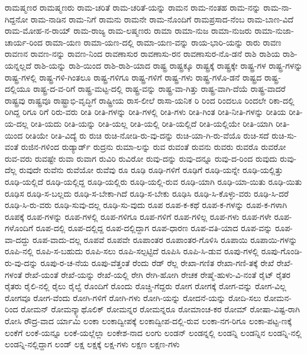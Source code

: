 {ರಾಮಷ್ಮಣರ
ರಾಮಷ್ಮಣರು
ರಾಮ-ಚರಿತೆ
ರಾಮ-ಚರಿತೆ-ಯನ್ನು
ರಾಮನ
ರಾಮ-ನಂತಹ
ರಾಮ-ನನ್ನು
ರಾಮ-ನಾ-ಗಿದ್ದನೋ
ರಾಮ-ನಾಡಿನ
ರಾಮ-ನಿಗೆ
ರಾಮನು
ರಾಮನೇ
ರಾಮ-ನೊಂದಿಗೆ
ರಾಮಪ್ರಸಾದ-ನೆಂಬ
ರಾಮ-ಬಾಣ-ವಿದೆ
ರಾಮ-ಮೋಹ-ನ-ರಾಯ್
ರಾಮ-ರಾಜ್ಯ
ರಾಮ-ಲಷ್ಮಣರು
ರಾಮಾ
ರಾಮಾ-ನುಜ
ರಾಮಾ-ನುಜರು
ರಾಮಾ-ನುಜಾ-ಚಾರ್ಯ-ರಿಂದ
ರಾಮಾ-ಯಣ
ರಾಮಾ-ಯಣ-ದಲ್ಲಿ
ರಾಮಾ-ಯಣ-ವನ್ನು
ರಾಯ-ಭಾರಿ-ಯನ್ನು
ರಾರು
ರಾವಣ
ರಾವಣನ
ರಾವಣ-ನನ್ನು
ರಾವಣ-ನಿಂದ
ರಾವಣಾಸುರ
ರಾವಣಾಸು-ರನ
ರಾವಣಾಸುರ-ನೊ-ಡನೆ
ರಾಶಿ
ರಾಶಿಯ
ರಾಶಿ-ಯನ್ನಲ್ಲದೆ
ರಾಶಿ-ಯನ್ನು
ರಾಶಿ-ಯಿಂದ
ರಾಶಿ-ರಾಶಿ-ಯಾದ
ರಾಷ್ಟ್ರ
ರಾಷ್ಟ್ರಕ್ಕೂ
ರಾಷ್ಟ್ರಕ್ಕೆ
ರಾಷ್ಟ್ರಕ್ಕೇ
ರಾಷ್ಟ್ರ-ಗಳ
ರಾಷ್ಟ್ರ-ಗಳನ್ನು
ರಾಷ್ಟ್ರ-ಗಳಲ್ಲಿ
ರಾಷ್ಟ್ರ-ಗಳಿ-ಗಿಂತಲೂ
ರಾಷ್ಟ್ರ-ಗಳಿಗೂ
ರಾಷ್ಟ್ರ-ಗಳಿಗೆ
ರಾಷ್ಟ್ರ-ಗಳು
ರಾಷ್ಟ್ರ-ಗಳೊ-ಡನೆ
ರಾಷ್ಟ್ರದ
ರಾಷ್ಟ್ರ-ದಲ್ಲಿಯೂ
ರಾಷ್ಟ್ರ-ದ-ವ-ರಿಗೆ
ರಾಷ್ಟ್ರ-ಮಟ್ಟ-ದಲ್ಲಿ
ರಾಷ್ಟ್ರ-ವನ್ನು
ರಾಷ್ಟ್ರ-ವಾ-ಗಿತ್ತು
ರಾಷ್ಟ್ರ-ವಾಗಿ-ದೆಯೆ
ರಾಷ್ಟ್ರ-ವಾದರೆ
ರಾಷ್ಟ್ರವು
ರಾಷ್ಟ್ರವೂ
ರಾಷ್ಟ್ರಾಭಿ-ವೃದ್ಧಿಗೆ
ರಾಷ್ಟ್ರೀಯ
ರಾಸ-ಲೀಲೆ
ರಾಸಾ-ಯನಿಕ
ರಿ
ರಿಂದ
ರಿಂದಲೂ
ರಿಂದಲೇ
ರಿಕಾ-ದಲ್ಲಿ
ರಿಗಿದ್ದ
ರಿಗೂ
ರಿಗೆ
ರಿರು-ವರು
ರೀತಿ
ರೀತಿ-ಗಳನ್ನು
ರೀತಿ-ಗಳಲ್ಲಿ
ರೀತಿ-ಗಳು
ರೀತಿ-ಗಿಂತ
ರೀತಿ-ನೀತಿ-ಗಳನ್ನು
ರೀತಿಯ
ರೀತಿ-ಯ-ದಲ್ಲ
ರೀತಿ-ಯದು
ರೀತಿ-ಯನ್ನು
ರೀತಿ-ಯಲ್ಲ
ರೀತಿ-ಯಲ್ಲಿ
ರೀತಿ-ಯಲ್ಲಿದೆ
ರೀತಿ-ಯಲ್ಲಿಯೇ
ರೀತಿ-ಯಾಗಿ
ರೀತಿ-ಯಿಂದ
ರೀತಿಯೇ
ರೀತಿ-ವಿದ್ಯೆ
ರು
ರುಚಿ
ರುಚಿ-ನೋಡಿ-ರು-ವು-ದನ್ನು
ರುಚಿ-ಯಾ-ಗಿ-ರು-ವೆಯೊ
ರುಚಿ-ಸದೆ
ರುಚಿ-ಸು-ವಂತೆ
ರುಜಿನ-ಗಳಿಂದ
ರುಡ್ಯಾರ್ಡ್
ರುದ್ರನು
ರುಮಾ-ಲನ್ನು
ರುವ
ರುವಂತೆ
ರುವನು
ರುವರು
ರುವರೊ
ರುವರೋ
ರುವ-ವರು
ರುವಷ್ಟೇ
ರುವಾ
ರುವಾಗ
ರುವಿರಿ
ರುವಿರೋ
ರುವು-ದನ್ನು
ರುವು-ದನ್ನೂ
ರುವು-ದ-ರಿಂದ
ರುವುದು
ರುವು-ದೆಲ್ಲ
ರುವುದೇ
ರುವೆನು
ರುವೆಯೋ
ರುವೆವು
ರೂ
ರೂಢಿ
ರೂಢಿ-ಗಳಿಗೆ
ರೂಢಿಗೆ
ರೂಢಿ-ಯನ್ನೇ
ರೂಢಿ-ಯಲ್ಲಿತ್ತು
ರೂಢಿ-ಯಲ್ಲಿದೆ
ರೂಢಿ-ಯಲ್ಲಿದ್ದ
ರೂಢಿ-ಯಲ್ಲಿರು
ರೂಢಿ-ಯಲ್ಲಿ-ರುವ
ರೂಢಿ-ಯಾಗಿ
ರೂಢಿ-ಯಾ-ಯಿತು
ರೂಢಿ-ಯಿತು
ರೂಢಿಸ
ರೂಢಿ-ಸ-ಬಲ್ಲದು
ರೂಢಿ-ಸ-ಬೇಕಾ-ಗಿದೆ
ರೂಢಿ-ಸ-ಬೇಕು
ರೂಢಿಸಿ
ರೂಢಿ-ಸಿ-ಕೊಳ್ಳು-ವರು
ರೂಢಿ-ಸಿ-ದರೆ
ರೂಢಿ-ಸಿ-ರು-ವರು
ರೂಢಿ-ಸುವು-ದಲ್ಲ
ರೂಢಿ-ಸು-ವುದು
ರೂಪ
ರೂಪ-ಕ-ಕಥೆ
ರೂಪ-ಕ-ಗಳನ್ನು
ರೂಪ-ಕ-ಗಳಾಗಿ
ರೂಪಕ್ಕೆ
ರೂಪ-ಗಳನ್ನು
ರೂಪ-ಗಳಲ್ಲಿ
ರೂಪ-ಗಳಿಗೂ
ರೂಪ-ಗಳಿಗೆ
ರೂಪ-ಗಳಿಲ್ಲ
ರೂಪ-ಗಳು
ರೂಪ-ಗಳೇ
ರೂಪ-ಗಳೊಂದಿಗೆ
ರೂಪ-ದಲ್ಲಿ
ರೂಪ-ದಲ್ಲಿದ್ದ
ರೂಪ-ದಲ್ಲಿದ್ದಾಗ
ರೂಪ-ಧಾರಣ
ರೂಪ-ವತಿ-ಯಾದ
ರೂಪ-ವನ್ನು
ರೂಪ-ವಾ-ದದ್ದು
ರೂಪ-ವಾದು-ದಲ್ಲ
ರೂಪವೆ
ರೂಪವೇ
ರೂಪಾಂತರ
ರೂಪಾಂತರ-ಗೊಳಿಸಿ
ರೂಪಾಯಿ
ರೂಪಾಯಿ-ಗಳನ್ನು
ರೂಪಿ-ನಲ್ಲಿ
ರೂಪಿ-ಸ-ಬಹುದು
ರೂಪಿ-ಸಲು
ರೂಪಿ-ಸಲ್ಪಟ್ಟಿದೆ
ರೂಪಿಸಿ
ರೂಪಿ-ಸಿ-ಡುವ
ರೂಪು-ಗಳಲ್ಲಿ
ರೂಪು-ಗೊಂಡಿ-ರು-ವು-ದನ್ನು
ರೂಪು-ರ-ಚ-ನೆಯ
ರೂಪು-ವೆತ್ತಂತೆ
ರೆಂದು
ರೆಡ್
ರೆಲ್ಲ
ರೇಖಾ-ಗಣಿತ
ರೇಖಾ-ಗಣಿ-ತಕ್ಕೆ
ರೇಖೆ
ರೇಖೆ-ಗಳಂತೆ
ರೇಖೆ-ಯಂತೆ
ರೇಖೆ-ಯನ್ನು
ರೇಖೆ-ಯಲ್ಲಿ
ರೇಗಿ
ರೇಗಿ-ಹೋಗಿ
ರೇಚಕ
ರೇಷ್ಮೆ-ಹುಳು-ವಿ-ನಂತೆ
ರೈಟ್
ರೈತರ
ರೈತರು
ರೈಲಿ-ನಲ್ಲಿ
ರೈಲು
ರೈಲ್ವೆ
ರೊಂದಿಗೆ
ರೊಂದು
ರೊಚ್ಚಿ-ಗೆದ್ದರು
ರೋಗ
ರೋಗಕ್ಕೆ
ರೋಗ-ವನ್ನು
ರೋಗ-ವಿಲ್ಲ
ರೋಗವೂ
ರೋಗ-ವೆಂದು
ರೋಗಿ-ಗಳಿಗೆ
ರೋಗಿ-ಗಳು
ರೋಗಿ-ಯನ್ನು
ರೋದನೆ-ಯನ್ನು
ರೋದಿ-ಸಲು
ರೋಮನ-ರಿಂದ
ರೋಮನ್
ರೋಮನ್ಕ್ಯಾಥೊಲಿಕ್
ರೋಮನ್ನರ
ರೋಮನ್ನರೂ
ರೋಮಾಂಚ-ಕರ
ರೋಮ್
ರೋಷಾ-ವಿಷ್ಟ-ರಾಗಿ
ರೋಸಿ
ರೌದ್ರ-ವಾದ
ರ್ಯಾಮಿ
ಲಂಕಾ
ಲಂಕಾದ್ವೀಪಕ್ಕೆ
ಲಂಕಾದ್ವೀಪ-ದಲ್ಲಿ-ರುವ
ಲಂಕಾ-ನಗ-ರಿಗೂ
ಲಂಕಾ-ಪಟ್ಟ-ಣಕ್ಕೆ
ಲಂಕೆಗೆ
ಲಂಕೆ-ಯನ್ನೂ
ಲಂಕೆ-ಯಲ್ಲೆಲ್ಲಾ
ಲಂಕೇಶ-ನಾದ
ಲಂಗು
ಲಂಡನ್
ಲಂಡನ್ನಲ್ಲಿ
ಲಂಡನ್ನಿ
ಲಂಡನ್ನಿನ
ಲಂಡನ್ನಿ-ನಲ್ಲಿ
ಲಂಡನ್ನಿ-ನಲ್ಲಿದ್ದಾಗ
ಲಂಡ್
ಲಕ್ಷ
ಲಕ್ಷಕ್ಕೆ
ಲಕ್ಷ-ಗಳು
ಲಕ್ಷಣ
ಲಕ್ಷಣ-ಗಳು
}
